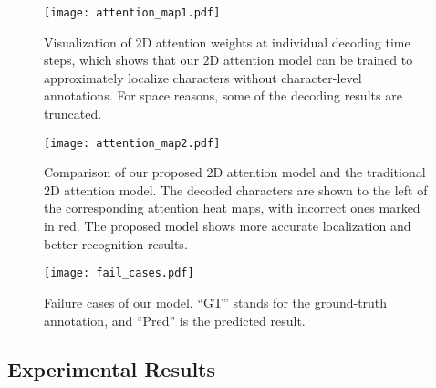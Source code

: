 \documentclass[letterpaper]{article} \usepackage{aaai19}  \usepackage{times}  \usepackage{helvet}  \usepackage{courier}  \usepackage{url}  \usepackage{graphicx}  \usepackage{amsmath}
\begin{document}
\begin{figure*}[th!]
	\begin{center}
		\texttt{[image: attention\_map1.pdf]}
	\end{center}
	\caption{
		Visualization of $2$D attention weights at individual decoding time steps, which shows that our $2$D attention model can be trained to approximately localize characters without character-level annotations. For space reasons, some of the decoding results are truncated.
	}
	\label{fig:visualization}

\end{figure*}

\begin{figure*}[t!]
	\begin{center}
		\texttt{[image: attention\_map2.pdf]}
	\end{center}
	\caption{Comparison of our proposed $2$D attention model and the traditional $2$D attention model.
		The decoded characters are shown to the left of the corresponding attention heat maps, with incorrect ones marked in red.
		The proposed model shows more accurate localization and better recognition results.
	}
	\label{fig:2atten}
\end{figure*}



\begin{figure}[t!]
	\begin{center}
		\texttt{[image: fail\_cases.pdf]}
	\end{center}
	\caption{Failure cases of our model. ``GT'' stands for the ground-truth annotation, and ``Pred'' is the predicted result.
	}
	\label{fig:failure}
\end{figure}

\subsection{Experimental Results}
\end{document}
